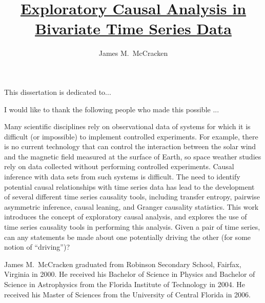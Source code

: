 \documentclass[11pt]{report}
\begin{document}
\title{\underline{Exploratory Causal Analysis in Bivariate Time Series Data}}
\author{James M.\ McCracken}










\signaturepage

\titlepage

\copyrightpage


\dedicationpage

\noindent This dissertation is dedicated to... 


\acknowledgementspage

\noindent I would like to thank the following people who made this possible ...

\tableofcontents

\listoftables

\listoffigures

\abstractpage
Many scientific disciplines rely on observational data of systems for which it is difficult (or impossible) to implement controlled experiments. For example, there is no current technology that can control the interaction between the solar wind and the magnetic field measured at the surface of Earth, so space weather studies rely on data collected without performing controlled experiments.  Causal inference with data sets from such systems is difficult.   The need to identify potential causal relationships with time series data has lead to the development of several different time series causality tools, including transfer entropy, pairwise asymmetric inference, causal leaning, and Granger causality statistics.  This work introduces the concept of exploratory causal analysis, and explores the use of time series causality tools in performing this analysis.  Given a pair of time series, can any statements be made about one potentially driving the other (for some notion of ``driving'')? 
\pagebreak

\startofchapters

  




\cvpage

James M.\ McCracken graduated from Robinson Secondary School, Fairfax, Virginia in 2000.  He received his Bachelor of Science in Physics and Bachelor of Science in Astrophysics from the Florida Institute of Technology in 2004.  He received his Master of Sciences from the University of Central Florida in 2006. 
\end{document}
